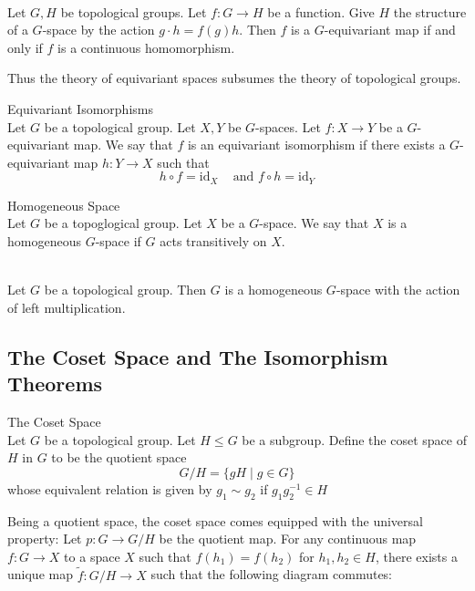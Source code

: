 \documentclass[a4paper]{article}
\begin{document}
\begin{eg}{}{}\\
Let $G,H$ be topological groups. Let $f:G\to H$ be a function. Give $H$ the structure of a $G$-space by the action $g\cdot h=f(g)h$. Then $f$ is a $G$-equivariant map if and only if $f$ is a continuous homomorphism. 
\end{eg}

Thus the theory of equivariant spaces subsumes the theory of topological groups. 

\begin{defn}{Equivariant Isomorphisms}{}\\
Let $G$ be a topological group. Let $X,Y$ be $G$-spaces. Let $f:X\to Y$ be a $G$-equivariant map. We say that $f$ is an equivariant isomorphism if there exists a $G$-equivariant map $h:Y\to X$ such that $$h\circ f=\text{id}_X\;\;\;\text{ and }f\circ h=\text{id}_Y$$
\end{defn}

\begin{defn}{Homogeneous Space}{}\\
Let $G$ be a topoglogical group. Let $X$ be a $G$-space. We say that $X$ is a homogeneous $G$-space if $G$ acts transitively on $X$. 
\end{defn}

\begin{prp}{}{}\\
Let $G$ be a topological group. Then $G$ is a homogeneous $G$-space with the action of left multiplication. 
\end{prp}

\subsection{The Coset Space and The Isomorphism Theorems}
\begin{defn}{The Coset Space}{}\\
Let $G$ be a topological group. Let $H\leq G$ be a subgroup. Define the coset space of $H$ in $G$ to be the quotient space $$G/H=\{gH\;|\;g\in G\}$$ whose equivalent relation is given by $g_1\sim g_2$ if $g_1g_2^{-1}\in H$
\end{defn}

Being a quotient space, the coset space comes equipped with the universal property: Let $p:G\to G/H$ be the quotient map. For any continuous map $f:G\to X$ to a space $X$ such that $f(h_1)=f(h_2)$ for $h_1,h_2\in H$, there exists a unique map $\widetilde{f}:G/H\to X$ such that the following diagram commutes: \\
\\
\end{document}
